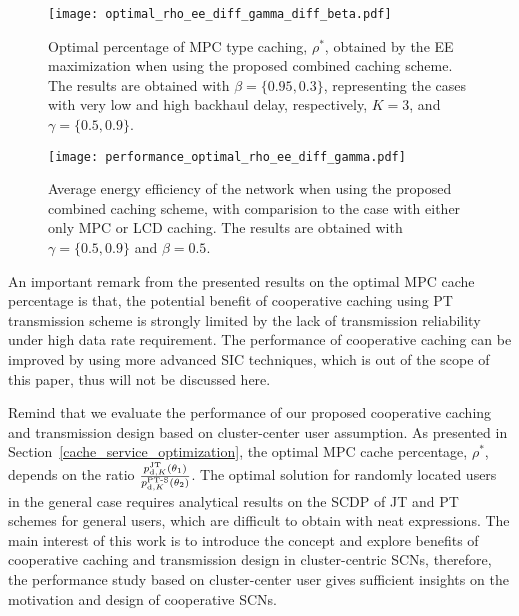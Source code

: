 \documentclass[twocolumns,10pt]{IEEEtran}
\begin{document}
\begin{figure}
	\centering
	\texttt{[image: optimal\_rho\_ee\_diff\_gamma\_diff\_beta.pdf]}
	\caption{Optimal percentage of MPC type caching, $\rho^{*}$, obtained by the EE maximization when using the proposed combined caching scheme. The results are obtained with $\beta=\{0.95, 0.3\}$, representing the cases with very low and high backhaul delay, respectively, $K=3$, and $\gamma=\{0.5, 0.9\}$.}
	\label{optimal_rho_ee_diff_beta}
\end{figure}



\begin{figure}
	\centering
	\texttt{[image: performance\_optimal\_rho\_ee\_diff\_gamma.pdf]}
	\caption{Average energy efficiency of the network when using the proposed combined caching scheme, with comparision to the case with either only MPC or LCD caching. The results are obtained with $\gamma=\{0.5,0.9\}$ and $\beta=0.5$.}
	\label{performance_optimal_rho}
\end{figure}

An important remark from the presented results on the optimal MPC cache percentage is that, the potential benefit of cooperative caching using PT transmission scheme is strongly limited by the lack of transmission reliability under high data rate requirement. The performance of cooperative caching can be improved by using more advanced SIC techniques, which is out of the scope of this paper, thus will not be discussed here. 

Remind that we evaluate the performance of our proposed cooperative caching and transmission design based on cluster-center user assumption. As presented in Section~\ref{cache_service_optimization}, the optimal MPC cache percentage, $\rho^{*}$, depends on the ratio $\frac{p_{\textnormal{d},K}^{\textnormal{JT}} (\theta_1) }{p_{\textnormal{d},K}^{\textnormal{PT-S}}(\theta_2)}$. The optimal solution for randomly located users in the general case requires analytical results on the SCDP of JT and PT schemes for general users, which are difficult to obtain with neat expressions. The main interest of this work is to introduce the concept and explore benefits of cooperative caching and transmission design in cluster-centric SCNs, therefore, the performance study based on cluster-center user gives sufficient insights on the motivation and design of cooperative SCNs.    
\end{document}
